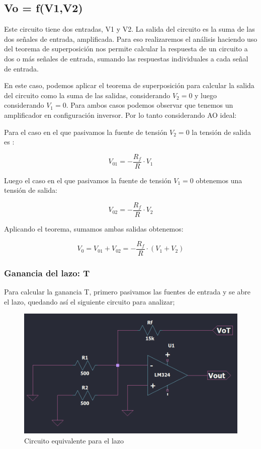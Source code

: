 \subsection{Vo = f(V1,V2)}

Este circuito tiene dos entradas, V1 y V2. 
La salida del circuito es la suma de las dos señales de entrada, amplificada. Para eso realizaremos el análisis haciendo uso del teorema de superposición nos permite calcular la respuesta de un circuito a dos o más señales de entrada, sumando las respuestas individuales a cada señal de entrada.

En este caso, podemos aplicar el teorema de superposición para calcular la salida del circuito como la suma de las salidas, considerando $V_2=0$ y luego considerando $V_1=0$. Para ambos casos podemos observar que tenemos un amplificador en configuración inversor. Por lo tanto considerando AO ideal: 

\vspace{1em}

Para el caso en el que pasivamos la fuente de tensión $V_2 = 0$ la tensión de salida es :

\[V_{01} = - \frac{R_f}{R} \cdot V_1 \]

Luego el caso en el que pasivamos la fuente de tensión $V_1 = 0$ obtenemos una tensión de salida:

\[V_{02} = - \frac{R_f}{R} \cdot V_2 \]

Aplicando el teorema, sumamos ambas salidas obtenemos:

\[V_{0} = V_{01} + V_{02} = - \frac{R_f}{R} \cdot (V_1 + V_2) \]

\vspace{1em}

\subsubsection{Ganancia del lazo: T}
Para calcular la ganancia T, primero pasivamos las fuentes de entrada y se abre el lazo, quedando así el siguiente circuito para analizar;

\begin{figure}[h!]
    \centering
    \includegraphics[width=0.90\linewidth]{img/equivalente_lazo.png}
    \caption{Circuito equivalente para el lazo}
    \label{fig:esquematico}
\end{figure}


